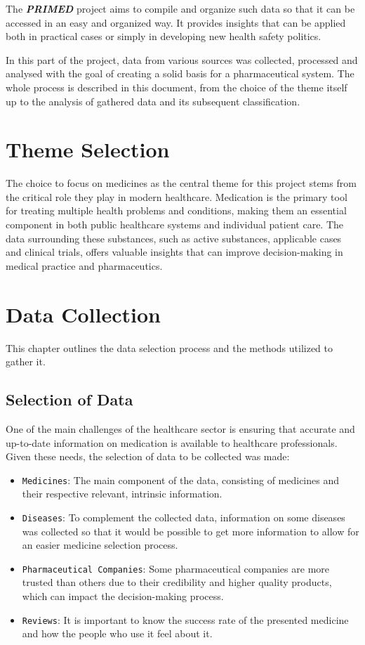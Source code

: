 \documentclass[sigconf]{acmart}
\begin{document}
The \textit{\textbf{PRIMED}} project aims to compile and organize such data so that it can be accessed in an easy and organized way. It provides insights that can be applied both in practical cases or simply in developing new health safety politics.

In this part of the project, data from various sources was collected, processed and analysed with the goal of creating a solid basis for a pharmaceutical system. The whole process is described in this document, from the choice of the theme itself up to the analysis of gathered data and its subsequent classification.

\section{Theme Selection}
The choice to focus on medicines as the central theme for this project stems from the critical role they play in modern healthcare. Medication is the primary tool for treating multiple health problems and conditions, making them an essential component in both public healthcare systems and individual patient care. The data surrounding these substances, such as active substances, applicable cases and clinical trials, offers valuable insights that can improve decision-making in medical practice and pharmaceutics.

\section{Data Collection}
This chapter outlines the data selection process and the methods utilized to gather it.

\subsection{Selection of Data}
One of the main challenges of the healthcare sector is ensuring that accurate and up-to-date information on medication is available to healthcare professionals. Given these needs, the selection of data to be collected was made:

\begin{itemize}
	\item {\texttt{Medicines}}: The main component of the data, consisting of medicines and their respective relevant, intrinsic information.
	\item {\texttt{Diseases}}: To complement the collected data, information on some diseases was collected so that it would be possible to get more information to allow for an easier medicine selection process.
	\item {\texttt{Pharmaceutical Companies}}: Some pharmaceutical companies are more trusted than others due to their credibility and higher quality products, which can impact the decision-making process.
	\item {\texttt{Reviews}}: It is important to know the success rate of the presented medicine and how the people who use it feel about it.
\end{itemize}
\end{document}
